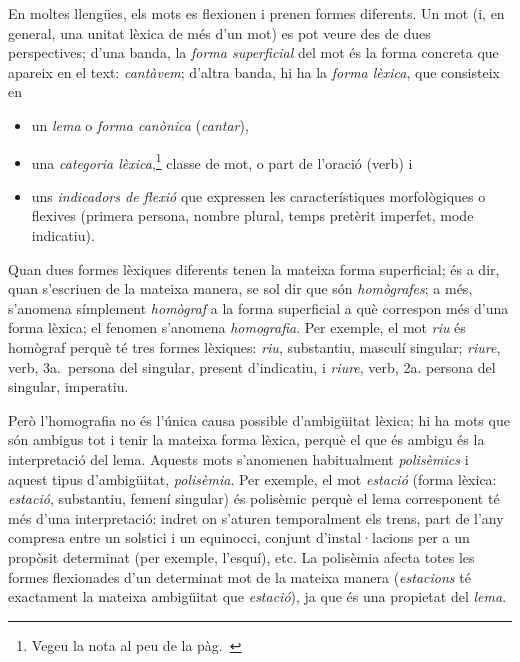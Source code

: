 En moltes llengües, els mots es flexionen i prenen formes diferents.
Un mot (i, en general, una unitat lèxica de més d'un mot) es pot veure
des de dues perspectives; d'una banda, la \emph{forma superficial}
del mot és la forma concreta que apareix en el text: \emph{cantàvem};
d'altra banda, hi ha la \emph{forma lèxica}, que consisteix en
\begin{itemize}
\item un \emph{lema} o \emph{forma canònica} (\emph{cantar}), 
\item una \emph{categoria lèxica},\label{pg:catlex}\footnote{Vegeu la nota al peu  de la pàg.~\pageref{pg:catgra}} classe de mot, o part de l'oració
  (verb) i 
\item uns \emph{indicadors de flexió} que expressen les característiques
morfològiques o flexives (primera persona, nombre plural, temps
pretèrit imperfet, mode indicatiu). 
\end{itemize}
Quan dues formes lèxiques diferents tenen la mateixa forma
superficial; és a dir, quan s'escriuen de la mateixa manera, se sol dir que
són \emph{homògrafes}\label{pg:homografia}; a més, s'anomena símplement \emph{homògraf} a
la forma superficial a què correspon més d'una forma lèxica; el
fenomen s'anomena \emph{homografia}. Per exemple, el mot \emph{riu} és
homògraf perquè té tres formes lèxiques: \emph{riu}, substantiu,
masculí singular; \emph{riure}, verb, 3a.\ persona del singular,
present d'indicatiu, i \emph{riure}, verb, 2a. persona del singular,
imperatiu.

Però l'homografia no és l'única causa possible d'ambigüitat lèxica; hi
ha mots que són ambigus tot i tenir la mateixa forma lèxica, perquè el
que és ambigu és la interpretació del lema. Aquests mots s'anomenen
habitualment \emph{polisèmics} i aquest tipus d'ambigüitat,
\emph{polisèmia}. Per exemple, el mot \emph{estació} (forma lèxica:
\emph{estació}, substantiu, femení singular) és polisèmic perquè el
lema corresponent té més d'una interpretació: indret on s'aturen
temporalment els trens, part de l'any compresa entre un solstici i un
equinocci, conjunt d'instal·lacions per a un propòsit determinat (per
exemple, l'esquí), etc. La polisèmia afecta totes les formes
flexionades d'un determinat mot de la mateixa manera (\emph{estacions}
té exactament la mateixa ambigüitat que \emph{estació}), ja que és una
propietat del \emph{lema}.

